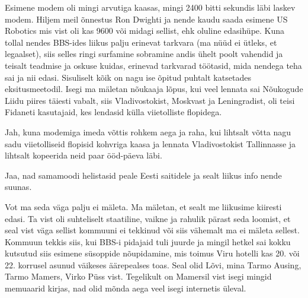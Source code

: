 Esimene modem oli  mingi arvutiga kaasas, mingi 2400 bitti sekundis läbi laskev modem. Hiljem meil õnnestus Ron Dwighti ja nende kaudu saada esimene US Robotics mis vist oli kas 9600 või midagi sellist, ehk oluline edasihüpe. Kuna tollal nendes BBS-ides liikus palju erinevat tarkvara (ma nüüd ei ütleks, et  legaalset), siis selles ringi surfamine sobramine andis ühelt poolt vahendid ja teisalt  teadmise ja oskuse kuidas,  erinevad tarkvarad töötasid, mida nendega teha sai ja nii edasi. Sisuliselt kõik on nagu ise õpitud  puhtalt  katsetades eksitusmeetodil. Isegi ma mäletan nõukaaja lõpus, kui veel lennata sai Nõukogude Liidu piires täiesti vabalt, siis Vladivostokist, Moskvast ja Leningradist, oli teisi Fidaneti kasutajaid, kes lendasid külla viietolliste flopidega.
                 

Jah,  kuna modemiga imeda võttis  rohkem aega ja raha, kui lihtsalt võtta nagu sadu viietolliseid flopisid kohvriga kaasa ja  lennata Vladivostokist Tallinnasse ja lihtsalt kopeerida neid paar ööd-päeva läbi.


Jaa, nad samamoodi helistasid peale Eesti saitidele ja sealt liikus info nende suunas. 

                 
Vot ma seda väga palju ei mäleta. Ma mäletan, et sealt me liikusime kiiresti edasi. Ta vist oli suhteliselt staatiline, vaikne ja rahulik pärast seda loomist, et seal vist väga sellist kommuuni ei tekkinud või siis vähemalt ma ei mäleta sellest.  Kommuun tekkis siis, kui BBS-i pidajaid tuli juurde ja mingil hetkel sai kokku kutsutud siis esimene süsoppide nõupidamine, mis toimus Viru hotelli kas  20. või 22. korrusel asunud väikeses äärepealses toas. Seal olid Lõvi, mina Tarmo Ausing, Tarmo Mamers, Virko Püss vist. Tegelikult on Mamersil vist isegi mingid memuaarid kirjas, nad olid mõnda aega veel isegi internetis üleval. 

                 


